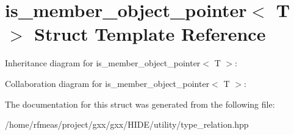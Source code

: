 \hypertarget{structis__member__object__pointer}{}\section{is\+\_\+member\+\_\+object\+\_\+pointer$<$ T $>$ Struct Template Reference}
\label{structis__member__object__pointer}


Inheritance diagram for is\+\_\+member\+\_\+object\+\_\+pointer$<$ T $>$\+:


Collaboration diagram for is\+\_\+member\+\_\+object\+\_\+pointer$<$ T $>$\+:


The documentation for this struct was generated from the following file\+:\begin{DoxyCompactItemize}
\item 
/home/rfmeas/project/gxx/gxx/\+H\+I\+D\+E/utility/type\+\_\+relation.\+hpp\end{DoxyCompactItemize}
